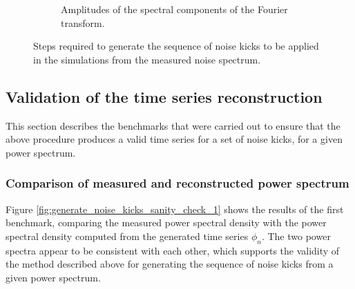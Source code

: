 \begin{figure}[!ht]
\begin{subfigure}[t]{0.42\textwidth}
        \caption{Amplitudes of the spectral components of the Fourier transform.}
        \label{fig:coast1_setting2_d}
    \end{subfigure}
    \hfill
    \centering
    \hfill
    \caption{Steps required to generate the sequence of noise kicks to be applied in the simulations from the measured noise spectrum.}
    \label{fig:noise_kick_generation}
\end{figure}


\subsection{Validation of the time series reconstruction}
This section describes the benchmarks that were carried out to ensure that the above procedure produces a valid time series for a set of noise kicks, for a given power spectrum. 

\subsubsection*{Comparison of measured and reconstructed power spectrum} %
Figure \ref{fig:generate_noise_kicks_sanity_check_1} shows the results of the first benchmark, comparing the measured power spectral density with the power spectral density computed from the generated time series $\phi_n$. The two power spectra appear to be consistent with each other, which supports the validity of the method described above for generating the sequence of noise kicks from a given power spectrum. 


